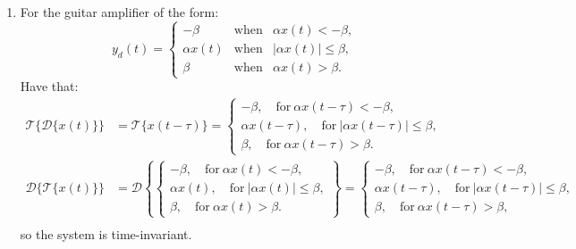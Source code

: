 \begin{enumerate}
  \item For the guitar amplifier of the form:
        \begin{equation*}
          y_d(t) = \left\{
          \begin{array}{rcr}
            -\beta      & \mathrm{when} & \alpha x(t)<-\beta,      \\
            \alpha x(t) & \mathrm{when} & |\alpha x(t)| \le \beta, \\
            \beta       & \mathrm{when} & \alpha x(t)>\beta.
          \end{array}
          \right.
        \end{equation*}
        Have that:
        \begin{align*}
          \mathcal{T}\{\mathcal{D}\{x(t)\}\} & =\mathcal{T}\{x(t-\tau)\}=\begin{cases}
                                                                           -\beta, \quad \text{for}\ \alpha x(t-\tau)<-\beta,               \\
                                                                           \alpha x(t-\tau), \quad \text{for}\ |\alpha x(t-\tau)|\le \beta, \\
                                                                           \beta, \quad \text{for}\ \alpha x(t-\tau)>\beta.
                                                                         \end{cases}              \\
          \mathcal{D}\{\mathcal{T}\{x(t)\}\} & =\mathcal{D}\left\{\begin{cases}
                                                                    -\beta, \quad \text{for}\ \alpha x(t)<-\beta,          \\
                                                                    \alpha x(t), \quad \text{for}\ |\alpha x(t)|\le \beta, \\
                                                                    \beta, \quad \text{for}\ \alpha x(t)>\beta.
                                                                  \end{cases}\right\}=\begin{cases}
                                                                                        -\beta, \quad \text{for}\ \alpha x(t-\tau)<-\beta,               \\
                                                                                        \alpha x(t-\tau), \quad \text{for}\ |\alpha x(t-\tau)|\le \beta, \\
                                                                                        \beta, \quad \text{for}\ \alpha x(t-\tau)>\beta,
                                                                                      \end{cases} \\
        \end{align*}
        so the system is time-invariant.


\end{enumerate}
